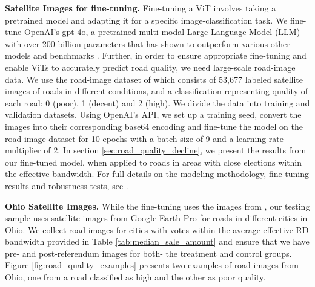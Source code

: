
{\bf Satellite Images for fine-tuning.} Fine-tuning a ViT involves taking a pretrained model and adapting it for a specific image-classification task. We fine-tune OpenAI's gpt-4o, a pretrained multi-modal Large Language Model (LLM) with over 200 billion parameters that has shown to outperform various other models and benchmarks \citep{achiam2023gpt}. Further, in order to ensure appropriate fine-tuning and enable ViTs to accurately predict road quality, we need large-scale road-image data. We use the road-image dataset of \cite{brewer2021} which consists of 53,677 labeled satellite images of roads in different conditions, and a classification representing quality of each road: 0 (poor), 1 (decent) and 2 (high). We divide the data into training and validation datasets. Using OpenAI's API, we set up a training seed, convert the images into their corresponding base64 encoding and fine-tune the model on the road-image dataset for 10 epochs with a batch size of 9 and a learning rate multiplier of 2. In section \ref{sec:road_quality_decline}, we present the results from our fine-tuned model, when applied to roads in areas with close elections within the effective bandwidth. For full details on the modeling methodology, fine-tuning results and robustness tests, see \cite{2025predicting}.

{\bf Ohio Satellite Images.} While the fine-tuning uses the images from \cite{brewer2021}, our testing sample uses satellite images from Google Earth Pro for roads in different cities in Ohio. We collect road images for cities with votes within the average effective RD bandwidth provided in Table \ref{tab:median_sale_amount} and ensure that we have pre- and post-referendum images for both- the treatment and control groups. Figure \ref{fig:road_quality_examples} presents two examples of road images from Ohio, one from a road classified as high and the other as poor quality.

